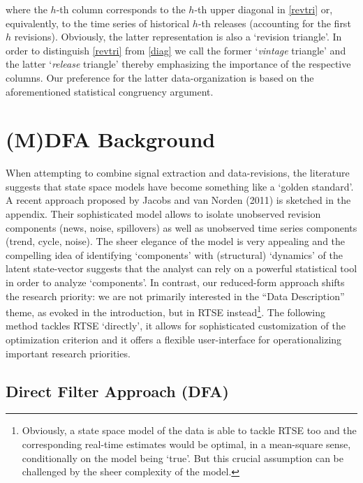 \documentclass[11pt]{article}
\begin{document}
where the $h$-th column corresponds to the $h$-th upper diagonal in \ref{revtri} or, equivalently, to the time series of historical $h$-th releases (accounting for the first $h$ revisions). Obviously, the latter representation is also a `revision triangle'. In order to distinguish \ref{revtri} from \ref{diag} we call the former `\emph{vintage} triangle' and the latter `\emph{release} triangle' thereby emphasizing the importance of the respective columns. Our preference for the latter data-organization is based on the aforementioned statistical congruency argument.









\section{(M)DFA Background}\label{dfas}

When attempting to combine signal extraction and data-revisions, the literature suggests that state space models have become something like a `golden standard'. A recent approach proposed by Jacobs and van Norden (2011) is sketched in the appendix. Their sophisticated model allows to isolate unobserved revision components (news, noise,  spillovers) as well as unobserved time series components (trend, cycle, noise). The sheer elegance of the model is very appealing and the compelling idea of identifying `components' with (structural) `dynamics' of the latent state-vector suggests that the analyst can rely on a powerful statistical tool in order to analyze `components'. In contrast, our reduced-form approach shifts the research priority: we are not primarily interested in the ``Data Description'' theme, as evoked in the introduction, but in RTSE instead\footnote{Obviously, a state space model of the data is able to tackle RTSE too and the corresponding real-time estimates would be optimal, in a mean-square sense, conditionally on the model being `true'. But this crucial assumption can be challenged  by the sheer complexity of the model.}.  The following method tackles RTSE `directly', it allows for sophisticated customization of the optimization criterion and it offers a flexible user-interface for operationalizing important research priorities.

\subsection{Direct Filter Approach (DFA)}\label{dfa}
\end{document}
